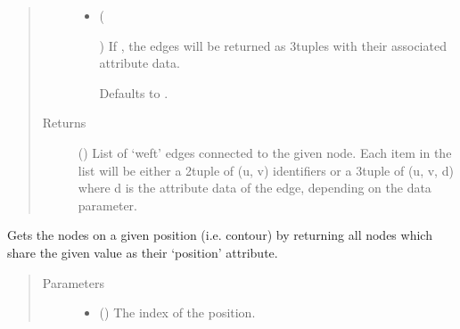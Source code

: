 \documentclass[letterpaper,10pt,english]{sphinxmanual}
\begin{document}
\begin{fulllineitems}
\begin{fulllineitems}
\begin{quote}
\begin{description}
\begin{itemize}
\item {} 
 (%
\begin{footnote}[102]\sphinxAtStartFootnote
{}
%
\end{footnote}\sphinxstyleliteralemphasis{\sphinxupquote{, }}) \textendash{} 
If , the edges will be returned as 3\sphinxhyphen{}tuples with their
associated attribute data.

Defaults to .


\end{itemize}

\item[{Returns}] \leavevmode
{} () \textendash{} List of ‘weft’ edges connected to the given node. Each item in the
list will be either a 2\sphinxhyphen{}tuple of (u, v) identifiers or a 3\sphinxhyphen{}tuple
of (u, v, d) where d is the attribute data of the edge, depending
on the data parameter.

\end{description}\end{quote}

\end{fulllineitems}


\begin{fulllineitems}
\label{\detokenize{cockatoo:cockatoo.KnitNetworkBase.nodes_on_position}}
Gets the nodes on a given position (i.e. contour) by returning all
nodes which share the given value as their ‘position’ attribute.
\begin{quote}\begin{description}
\item[{Parameters}] \leavevmode\begin{itemize}
\item {} 
 () \textendash{} The index of the position.


\end{itemize}
\end{description}
\end{quote}
\end{fulllineitems}
\end{fulllineitems}
\end{document}
